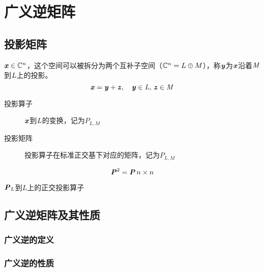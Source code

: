 \chapter{广义逆矩阵}
\label{cha:广义逆矩阵}



\section{投影矩阵}
\label{sec:投影矩阵}

\begin{definition}[投影矩阵]
    $\boldsymbol{\mathit{x}} \in \mathbb{C}^{n}$，这个空间可以被拆分为两个互补子空间（$\mathbb{C}^n = L \oplus M$），称$\boldsymbol{\mathit{y}}$为$\boldsymbol{\mathit{x}}$沿着$\mathit{M}$到$\mathit{L}$上的投影。
    $$
    \boldsymbol{\mathit{x}} = \boldsymbol{\mathit{y}} + \boldsymbol{\mathit{z}}, \quad \boldsymbol{\mathit{y}} \in \mathit{L},\, \boldsymbol{\mathit{z}} \in \mathit{M}
    $$

    \begin{description}
        \item[投影算子] $\boldsymbol{\mathit{x}}$到$\mathit{L}$的变换，记为$P_{L,M}$
        \item[投影矩阵] 投影算子在标准正交基下对应的矩阵，记为$P_{L,M}$
    \end{description}
\end{definition}

\begin{definition}[幂等矩阵]
    $$
    \boldsymbol{\mathit{P}}^2 = \boldsymbol{\mathit{P}}\, n \times n
    $$
\end{definition}

\begin{definition}
    $\boldsymbol{\mathit{P}}_L$\quad 到$L$上的正交投影算子
\end{definition}

\section{广义逆矩阵及其性质}
\label{sec:广义逆矩阵及其性质}

\subsection{广义逆的定义}
\label{sub:广义逆的定义}

\begin{definition}
\end{definition}

\subsection{广义逆的性质}
\label{sub:广义逆的性质}

